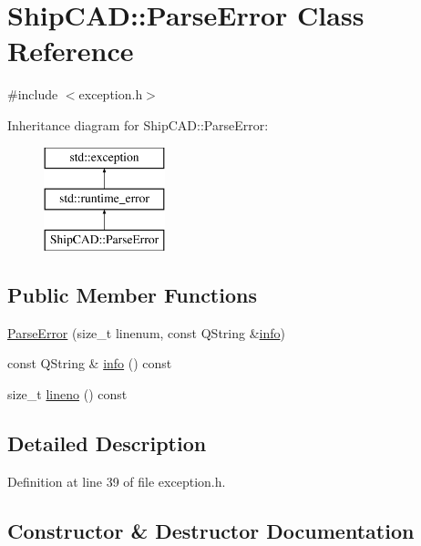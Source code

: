 \hypertarget{classShipCAD_1_1ParseError}{}\section{Ship\+C\+AD\+:\+:Parse\+Error Class Reference}
\label{classShipCAD_1_1ParseError}


{\ttfamily \#include $<$exception.\+h$>$}

Inheritance diagram for Ship\+C\+AD\+:\+:Parse\+Error\+:\begin{figure}[H]
\begin{center}
\leavevmode
\includegraphics[height=3.000000cm]{classShipCAD_1_1ParseError}
\end{center}
\end{figure}
\subsection*{Public Member Functions}
\begin{DoxyCompactItemize}
\item 
\hyperlink{classShipCAD_1_1ParseError_aa4bb0213988602df68319e7dae54dfe6}{Parse\+Error} (size\+\_\+t linenum, const Q\+String \&\hyperlink{classShipCAD_1_1ParseError_adddab14352397af6868f8ab973108efa}{info})
\item 
const Q\+String \& \hyperlink{classShipCAD_1_1ParseError_adddab14352397af6868f8ab973108efa}{info} () const 
\item 
size\+\_\+t \hyperlink{classShipCAD_1_1ParseError_a572bd9bbbf1d7b6683c8a758a37be7a3}{lineno} () const 
\end{DoxyCompactItemize}


\subsection{Detailed Description}


Definition at line 39 of file exception.\+h.



\subsection{Constructor \& Destructor Documentation}

